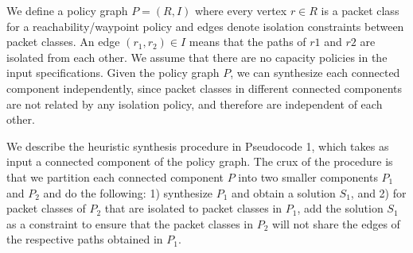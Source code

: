
We define a policy graph $P = (R, I)$ where every vertex $r \in R$
is a packet class for a reachability/waypoint policy and edges
denote isolation constraints between packet classes.
An edge $(r_1,r_2) \in I$  means that the paths of $r1$ and $r2$ are
isolated from each other. We assume that there are no capacity policies
in the input specifications. 
  Given the policy graph $P$, we
can synthesize each connected component independently, since packet
classes in different connected components are not related by any
isolation policy, and therefore are independent of each other.

We describe the heuristic synthesis procedure in Pseudocode 1,
which takes as input a connected component of the policy graph.
 The crux of the procedure is that we partition each connected component $P$
  into two smaller components $P_1$ and $P_2$
  and do the following:
1) synthesize $P_1$ and obtain a solution $S_1$, and
2) for packet classes of $P_2$ that are
isolated to packet classes in $P_1$, 
add the solution $S_1$ as a constraint to ensure that the
packet classes in $P_2$ will not share the edges of the respective
paths obtained in $P_1$. 

